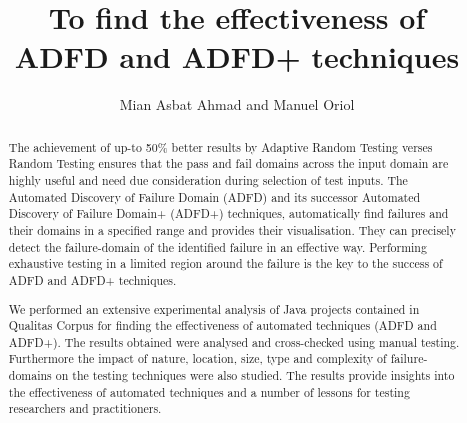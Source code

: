 \documentclass[conference]{IEEEtran}
\begin{document}
\title{To find the effectiveness of \\ADFD and ADFD+ techniques}
\author{Mian Asbat Ahmad and Manuel Oriol}
\maketitle
\vspace*{0\baselineskip}
\begin{abstract}


The achievement of up-to 50\% better results by Adaptive Random Testing verses Random Testing ensures that the pass and fail domains across the input domain are highly useful and need due consideration during selection of test inputs. The Automated Discovery of Failure Domain (ADFD) and its successor Automated Discovery of Failure Domain+ (ADFD+) techniques, automatically find failures and their domains in a specified range and provides their visualisation. They can precisely detect the failure-domain of the identified failure in an effective way. Performing exhaustive testing in a limited region around the failure is the key to the success of ADFD and ADFD+ techniques.

We performed an extensive experimental analysis of Java projects contained in Qualitas Corpus for finding the effectiveness of automated techniques (ADFD and ADFD+). The results obtained were analysed and cross-checked using manual testing. Furthermore the impact of nature, location, size, type and complexity of failure-domains on the testing techniques were also studied. The results provide insights into the effectiveness of automated techniques and a number of lessons for testing researchers and practitioners.



\end{abstract}
\end{document}
